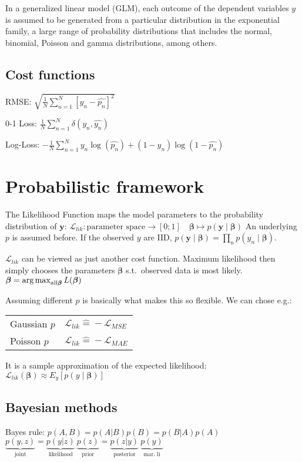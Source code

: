 \documentclass[10pt,a4paper,landscape]{article}
\renewcommand{\bf}[1]{\ensuremath{\mathbf{#1}}}
\newcommand{\bbeta}{\boldsymbol\beta}
\newcommand{\st}{s.t.}
\begin{document}
\begin{multicols*}{4}
In a generalized linear model (GLM), each outcome of the dependent variables $y$ is assumed to be generated from a particular distribution in the exponential family, a large range of probability distributions that includes the normal, binomial, Poisson and gamma distributions, among others.


\subsection{Cost functions}
RMSE: $\sqrt{\frac{1}{N} \sum_{n=1}^{N}\left[y_n- \hat{p_n} \right]^2}$

0-1 Loss: $ \frac{1}{N} \sum_{n=1}^{N} \delta(y_n, \hat{y_n})$

Log-Loss: $- \frac{1}{N}  \sum_{n=1}^{N} y_n \log(\hat{p_n}) + (1-y_n) \log(1-\hat{p_n})$

\section{Probabilistic framework}
The Likelihood Function maps the model parameters to the probability distribution of $\bf{y}$:
$\mathcal{L}_{lik}\colon \text{parameter space} \to [0;1]\quad  \bbeta \mapsto p(\bf{y} \mid  \bbeta)$
An underlying $p$ is assumed before. If the observed $y$ are IID, $p(\bf{y} \mid \bbeta) = \prod_n p(y_n \mid \bbeta)$.

$\mathcal{L}_{lik}$ can be viewed as just another cost function. Maximum likelihood then simply chooses the parameters $\bbeta$ \st\ observed data is most likely. $\bbeta = \argmax_{\text{all} \bbeta} L(\bbeta)$

Assuming different $p$ is basically what makes this so flexible. We can chose e.g.:

\begin{tabular}{ l  l }
  \hline
  Gaussian $p$ & $\mathcal{L}_{lik} \widehat{=} -\mathcal{L}_{MSE}$ \\
  Poisson $p$  & $\mathcal{L}_{lik} \widehat{=} -\mathcal{L}_{MAE}$ \\
  \hline
\end{tabular}

It is a sample approximation of the expected likelihood:
$\mathcal{L}_{lik}(\bbeta) \approx E_y[ p(y \mid \bbeta) ]$

\subsection{Bayesian methods}
Bayes rule: $p(A, B) = p(A|B) p(B) = p(B|A) p(A)$\\
$\underbrace{p(y,z)}_{\text{joint}} = \underbrace{p(y|z)}_{\text{likelihood}}\: \underbrace{p(z)}_{\text{prior}} = \underbrace{p(z|y)}_{\text{posterior}}\: \underbrace{p(y)}_{\text{mar. li}}$


\end{multicols*}
\end{document}
